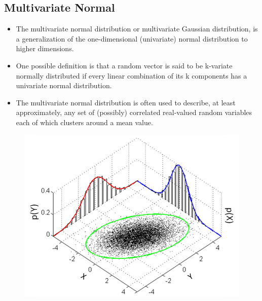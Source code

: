 \documentclass[]{article}
\begin{document}
\newpage

\subsection{Multivariate Normal}
{\large
\begin{itemize}
\item The multivariate normal distribution or multivariate Gaussian distribution, is a generalization of the one-dimensional (univariate) normal distribution to higher dimensions.\item One possible definition is that a random vector is said to be k-variate normally distributed if every linear combination of its k components has a univariate normal distribution. 
\item The multivariate normal distribution is often used to describe, at least approximately, any set of (possibly) correlated real-valued random variables each of which clusters around a mean value.
\end{itemize}
}
\begin{figure}[h!]
\centering
\includegraphics[width=0.8\linewidth]{./793px-MultivariateNormal}
\caption{}
\label{fig:793px-MultivariateNormal}
\end{figure}
\newpage
\end{document}

